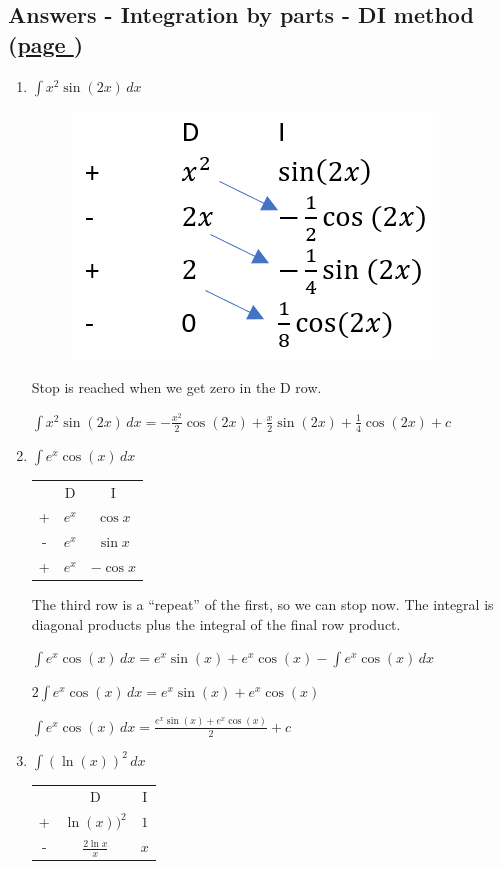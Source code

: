 \documentclass[../main.tex]{subfiles}
\begin{document}
\hypertarget{dimethodanswers}{\subsection*{Answers - Integration by parts - DI method (\hyperlink{dimethodlink}{page \pageref{DI Method}})}}

\label{DI method answers}
\begin{enumerate}
    \item \(\int x^2\sin{(2x)}\, dx\)
    
    \begin{figure}[h]
    \setlength\parindent{30pt}
        \includegraphics[width=0.25\linewidth]{images/di_a1.png}
    \end{figure}
    
    Stop is reached when we get zero in the D row.

    \(\int x^2\sin{(2x)}\, dx=-\frac{x^2}{2}\cos{(2x)}+\frac{x}{2}\sin{(2x)}+\frac{1}{4}\cos{(2x)}+c\)

    \item \(\int e^x \cos{(x)}\, dx\)
    
    \begin{tabular}{ c c c }
       & D & I \\ 
     +  & $e^x$ &$\cos{x}$ \\  
     - & $e^x$ & $\sin{x}$\\
      + & $e^x$ & $-\cos{x}$ \\  
    \end{tabular}

    The third row is a “repeat” of the first, so we can stop now. The integral is diagonal products plus the integral of the final row product.

    \(\int e^x \cos{(x)}\, dx = e^x\sin{(x)}+e^x\cos{(x)}-\int e^x\cos{(x)}\,dx\)

    \(2\int e^x \cos{(x)}\, dx= e^x\sin{(x)}+e^x\cos{(x)}\)

    \(\int e^x \cos{(x)}\, dx=\frac{e^x\sin{(x)}+e^x\cos{(x)}}{2}+c\)
    
    \item \(\int (\ln{(x)})^2\, dx\)
    
    \begin{tabular}{ c c c }
       & D & I \\ 
     +  & $\ln{(x)})^2$ &$1$ \\  
     - & $\frac{2\ln{x}}{x}$ & $x$\\ 
    \end{tabular}


\end{enumerate}
\end{document}
